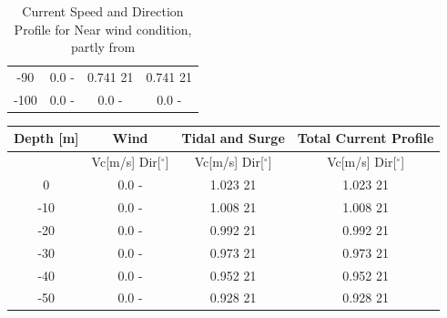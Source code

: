 \begin{table} [H]
\begin{tabular}{ |c|c|c|c|}
 -90 & 0.0 \hspace{0.7cm} - & 0.741 \hspace{0.7cm} 21  & 0.741 \hspace{1.15cm} 21 \\ 
 -100 & 0.0 \hspace{0.7cm} - & 0.0 \hspace{0.7cm} -  & 0.0 \hspace{1.15cm} - \\ 
 \hline
\end{tabular}
\caption{Current Speed and Direction Profile for Near wind condition, partly from \cite{Lifes50+D1.1}}
\label{table:tidcurnear}
\end{table}   

\begin{table} [H]
\centering
\begin{tabular}{ |c|c|c|c|}
\hline
Depth [m] & Wind & Tidal and Surge & Total Current Profile \\
 \hline
 \hline
 & Vc[m/s] \hspace{0.3cm} Dir[$^{\circ}$] &  Vc[m/s] \hspace{0.3cm} Dir[$^{\circ}$] & Vc[m/s] \hspace{0.3cm} Dir[$^{\circ}$] \\
 \hline
 0 & 0.0 \hspace{0.7cm} - & 1.023 \hspace{0.7cm} 21  & 1.023 \hspace{0.7cm} 21 \\
 -10 & 0.0 \hspace{0.7cm} - & 1.008 \hspace{0.7cm} 21  & 1.008 \hspace{0.7cm} 21 \\
 -20 & 0.0 \hspace{0.7cm} - & 0.992 \hspace{0.7cm} 21  & 0.992
 \hspace{0.7cm} 21 \\
 -30 & 0.0 \hspace{0.7cm} - & 0.973 \hspace{0.7cm} 21  & 0.973 \hspace{0.7cm} 21 \\
 -40 & 0.0 \hspace{0.7cm} - & 0.952 \hspace{0.7cm} 21  & 0.952 \hspace{0.7cm} 21 \\
 -50 & 0.0 \hspace{0.7cm} - & 0.928 \hspace{0.7cm} 21  & 0.928 \hspace{0.7cm} 21 \\

\end{tabular}
\end{table}
